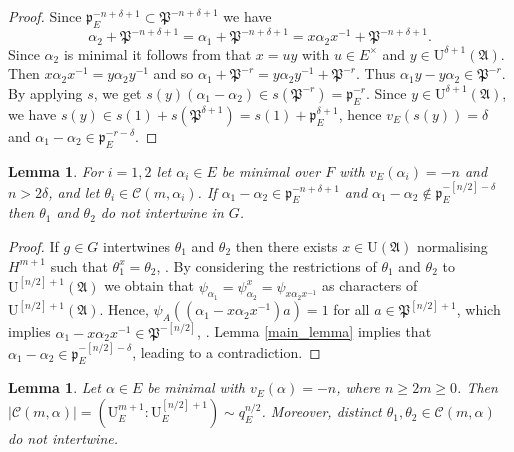 \documentclass[JEP,XML,SOM,Unicode,NoEqCountersInSection]{cedram}
\let\mathcal\mathscr
\newtheorem{lem}[prop]{Lemma}
\theoremstyle{definition}
\newcommand{\Aa}{\mathfrak A}
\newcommand{\Pp}{\mathfrak P}
\newcommand{\pp}{\mathfrak p}
\newcommand{\UU}{\mathrm U}
\begin{document}
\begin{proof} Since $\pp^{-n+\delta+1}_E\subset \Pp^{-n+\delta+1}$ we have
\[
\alpha_2+ \Pp^{-n+\delta+1} = \alpha_1 + \Pp^{-n+\delta+1}=x \alpha_2 x^{-1}+ \Pp^{-n+\delta+1}.
\]
Since $\alpha_2$ is minimal it follows from \cite[Th.\,2.4]{KM} that $x= u y$ with $u\in E^{\times}$ and $y\in \UU^{\delta+1}(\Aa)$. Then
$x \alpha_2 x^{-1}= y\alpha_2 y^{-1}$ and so
$ \alpha_1+ \Pp^{-r}= y \alpha_2 y^{-1} +\Pp^{-r}$. Thus $\alpha_1 y - y \alpha_2 \in \Pp^{-r}$. By applying $s$, we get
$s(y)( \alpha_1 - \alpha_2)\in s(\Pp^{-r})= \pp_E^{-r}$. Since $y\in \UU^{\delta+1}(\Aa)$, we have $s(y)\in s(1)+s(\Pp^{\delta+1})= s(1)+ \pp_E^{\delta+1}$, hence
$v_E(s(y))= \delta$ and $\alpha_1 - \alpha_2\in \pp_E^{-r-\delta}$.
\end{proof}

\begin{lem}\label{notinter} For $i=1, 2$ let $\alpha_i\in E$ be minimal over $F$ with $v_E(\alpha_i)=-n$ and $n> 2\delta$, and let $\theta_i\in \mathcal C(m, \alpha_i)$.
If $\alpha_1- \alpha_2\in \pp_E^{-n+\delta +1}$ and $\alpha_1-\alpha_2 \not\in \pp_E^{-[n/2]-\delta}$ then $\theta_1$ and $\theta_2$ do not intertwine in $G$.
\end{lem}

\begin{proof} If $g\in G$ intertwines $\theta_1$ and $\theta_2$ then there exists $x\in \UU(\Aa)$ normalising $H^{m+1}$ such that $\theta_1^x= \theta_2$, \cite[(3.5.11)]{BK}.
By considering the restrictions of $\theta_1$ and $\theta_2$ to $\UU^{[n/2]+1}(\Aa)$ we obtain that $\psi_{\alpha_1}= \psi^x_{\alpha_2}= \psi_{x \alpha_2 x^{-1}}$ as
characters of $\UU^{[n/2]+1}(\Aa)$. Hence, $\psi_A((\alpha_1 - x \alpha_2 x^{-1}) a)=1$ for all $a\in \Pp^{[n/2]+1}$, which implies $\alpha_1- x \alpha_2 x^{-1}\in \Pp^{-[n/2]}$,
\cite[p.\,22]{BK}. Lemma \ref{main_lemma} implies that $\alpha_1-\alpha_2 \in \pp_E^{-[n/2]-\delta}$, leading to a contradiction.
\end{proof}

\begin{lem}\label{single_alpha} Let $\alpha\in E$ be minimal with $v_E(\alpha)=-n$, where $n\ge 2m\ge 0$. Then $|\mathcal C(m, \alpha)| = (\UU^{m+1}_E : \UU^{[n/2]+1}_E)\sim q_E^{n/2}$.
Moreover, distinct $\theta_1, \theta_2\in \mathcal C(m, \alpha)$ do not intertwine.
\end{lem}
\end{document}

